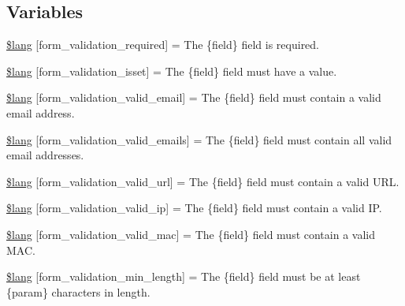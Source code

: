\subsection*{Variables}
\begin{DoxyCompactItemize}
\item 
\mbox{\hyperlink{form__validation__lang_8php_a7c6b74d48acd188829365b6db579aa56}{\$lang}} \mbox{[}\textquotesingle{}form\+\_\+validation\+\_\+required\textquotesingle{}\mbox{]} = \textquotesingle{}The \{field\} field is required.\textquotesingle{}
\item 
\mbox{\hyperlink{form__validation__lang_8php_a6ae716d42d07e49ae48e06d0e9d9843a}{\$lang}} \mbox{[}\textquotesingle{}form\+\_\+validation\+\_\+isset\textquotesingle{}\mbox{]} = \textquotesingle{}The \{field\} field must have a value.\textquotesingle{}
\item 
\mbox{\hyperlink{form__validation__lang_8php_a20ebb5d6430eda30d97f673364274dd8}{\$lang}} \mbox{[}\textquotesingle{}form\+\_\+validation\+\_\+valid\+\_\+email\textquotesingle{}\mbox{]} = \textquotesingle{}The \{field\} field must contain a valid email address.\textquotesingle{}
\item 
\mbox{\hyperlink{form__validation__lang_8php_ae09639726ac794f66bb9fdef490cfd84}{\$lang}} \mbox{[}\textquotesingle{}form\+\_\+validation\+\_\+valid\+\_\+emails\textquotesingle{}\mbox{]} = \textquotesingle{}The \{field\} field must contain all valid email addresses.\textquotesingle{}
\item 
\mbox{\hyperlink{form__validation__lang_8php_a7b1558f69e002c2ef22c7ee3b11fdbbb}{\$lang}} \mbox{[}\textquotesingle{}form\+\_\+validation\+\_\+valid\+\_\+url\textquotesingle{}\mbox{]} = \textquotesingle{}The \{field\} field must contain a valid U\+R\+L.\textquotesingle{}
\item 
\mbox{\hyperlink{form__validation__lang_8php_a1a11ad1b087a43f55547dbf5f538ce6e}{\$lang}} \mbox{[}\textquotesingle{}form\+\_\+validation\+\_\+valid\+\_\+ip\textquotesingle{}\mbox{]} = \textquotesingle{}The \{field\} field must contain a valid I\+P.\textquotesingle{}
\item 
\mbox{\hyperlink{form__validation__lang_8php_ac62486aeefc25584c786d931b9a849dc}{\$lang}} \mbox{[}\textquotesingle{}form\+\_\+validation\+\_\+valid\+\_\+mac\textquotesingle{}\mbox{]} = \textquotesingle{}The \{field\} field must contain a valid M\+A\+C.\textquotesingle{}
\item 
\mbox{\hyperlink{form__validation__lang_8php_a252fb8841eee58dd9ee9541c192ada2d}{\$lang}} \mbox{[}\textquotesingle{}form\+\_\+validation\+\_\+min\+\_\+length\textquotesingle{}\mbox{]} = \textquotesingle{}The \{field\} field must be at least \{param\} characters in length.\textquotesingle{}

\end{DoxyCompactItemize}

